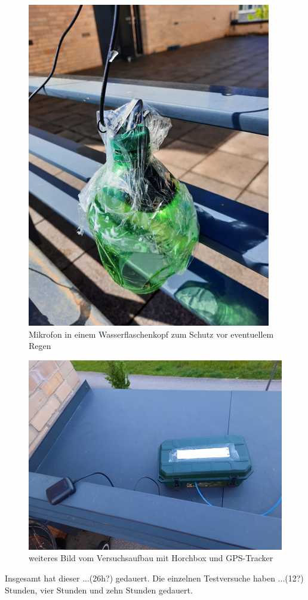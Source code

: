 \begin{figure}
    \centering
    \includegraphics[width=0.5\linewidth]{../grafik.png}
    \caption{Mikrofon in einem Wasserflaschenkopf zum Schutz vor eventuellem Regen}
    \label{fig:enter-label}
\end{figure}

\begin{figure}
    \centering
    \includegraphics[width=1\linewidth]{../wohnheim_03.png}
    \caption{weiteres Bild vom Versuchsaufbau mit Horchbox und GPS-Tracker}
    \label{fig:enter-label}
\end{figure}

Insgesamt hat dieser ...(26h?) gedauert.
Die einzelnen Testversuche haben ...(12?) Stunden, vier Stunden und zehn Stunden gedauert.

